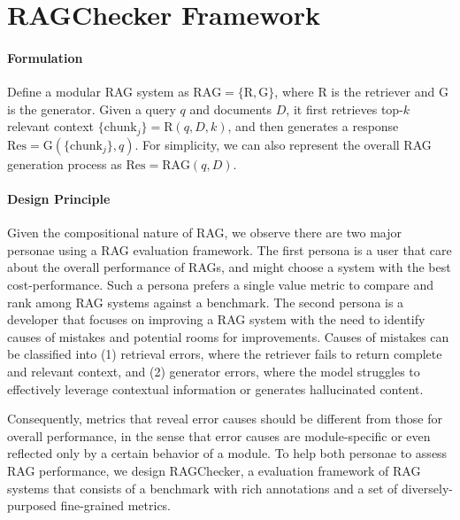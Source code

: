 \section{RAGChecker Framework}


\paragraph{Formulation} Define a modular RAG system as $\text{RAG} = \{\text{R}, \text{G}\}$, where $\text{R}$ is the retriever and $\text{G}$ is the generator. Given a query $q$ and documents $D$, it first retrieves top-$k$ relevant context $\{\text{chunk}_j\}=\text{R}(q, D, k)$, and then generates a response $\text{Res} = \text{G}(\{\text{chunk}_j\}, q)$. For simplicity, we can also represent the overall RAG generation process as $\text{Res} = \text{RAG}(q, D)$.

\paragraph{Design Principle} Given the compositional nature of RAG, we observe there are two major personae using a RAG evaluation framework. The first persona is a user that care about the overall performance of RAGs, and might choose a system with the best cost-performance. Such a persona prefers a single value metric to compare and rank among RAG systems against a benchmark. The second persona is a developer that focuses on improving a RAG system with the need to identify causes of mistakes and potential rooms for improvements. Causes of mistakes can be classified into (1) retrieval errors, where the retriever fails to return complete and relevant context, and (2) generator errors, where the model struggles to effectively leverage contextual information or generates hallucinated content.

Consequently, metrics that reveal error causes should be different from those for overall performance, in the sense that error causes are module-specific or even reflected only by a certain behavior of a module. To help both personae to assess RAG performance, we design RAGChecker, a evaluation framework of RAG systems that consists of a benchmark with rich annotations and a set of diversely-purposed fine-grained metrics.

